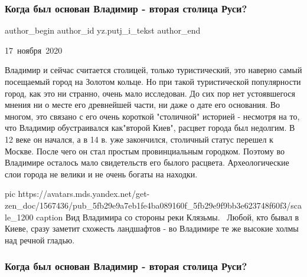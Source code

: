  
 
 
 
 
 
\subsubsection{Когда был основан Владимир - вторая столица Руси?}
\label{sec:17_11_2020.sites.ru.zen_yandex.yz.putj_i_tekst.1.vladimir_vtoraja_stolica_rusi}
\ifcmt
	author_begin
   author_id yz.putj_i_tekst
	author_end
\fi

17 ноября 2020

Владимир и сейчас считается столицей, только туристический, это наверно
самый посещаемый город на Золотом кольце. Но при такой туристической
популярности город, как это ни странно, очень мало исследован. До сих пор
нет устоявшегося мнения ни о месте его древнейшей части, ни даже о дате
его основания. Во многом, это связано с его очень короткой "столичной"
историей - несмотря на то, что Владимир обустраивался как"второй Киев",
расцвет города был недолгим. В 12 веке он начался, а в 14 в. уже
закончился, столичный статус перешел к Москве. После чего он стал простым
провинциальным городком. Поэтому во Владимире осталось мало свидетельств
его былого расцвета. Археологические слои города не велики и не очень
богаты на находки.

\ifcmt
pic https://avatars.mds.yandex.net/get-zen_doc/1567436/pub_5fb29e9a7eb1fe4ba089160f_5fb29e9f9bb3e623748f60f3/scale_1200
caption Вид Владимира со стороны реки Клязьмы.  Любой, кто бывал в Киеве, сразу заметит схожесть ландшафтов - во Владимире те же высокие холмы над речной гладью.
\fi

\subsubsection{Когда был основан Владимир - вторая столица Руси?}


